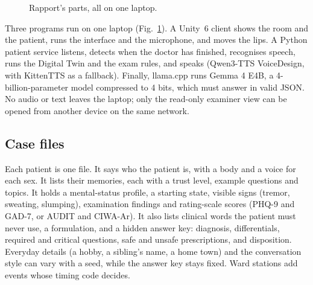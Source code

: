 \documentclass[journal]{IEEEtran}
\begin{document}
\begin{figure}[t]
\centering
{}
\caption{Rapport's parts, all on one laptop.}
\label{fig:overview}
\end{figure}

Three programs run on one laptop (Fig.~\ref{fig:overview}). A Unity~6 client shows the room and the patient, runs the interface and the microphone, and moves the lips. A Python patient service listens, detects when the doctor has finished, recognises speech, runs the Digital Twin and the exam rules, and speaks (Qwen3-TTS VoiceDesign, with KittenTTS as a fallback). Finally, llama.cpp \cite{llamacpp} runs Gemma 4 E4B, a 4-billion-parameter model compressed to 4 bits, which must answer in valid JSON. No audio or
text leaves the laptop; only the read-only examiner view can be opened from another device on the same network.

\subsection{Case files}
Each patient is one file. It says who the patient is, with a body and a voice for each sex. It lists their memories, each with a trust level, example questions and topics. It holds a mental-status profile, a starting state, visible signs (tremor, sweating, slumping), examination findings and rating-scale scores (PHQ-9 and GAD-7, or AUDIT and CIWA-Ar). It also lists clinical words the patient must never use, a formulation, and a hidden answer key: diagnosis, differentials, required and critical questions, safe and unsafe prescriptions, and disposition. Everyday details (a hobby, a sibling's name, a home town) and the conversation style can
vary with a seed, while the answer key stays fixed. Ward stations add events whose timing code decides.
\end{document}
